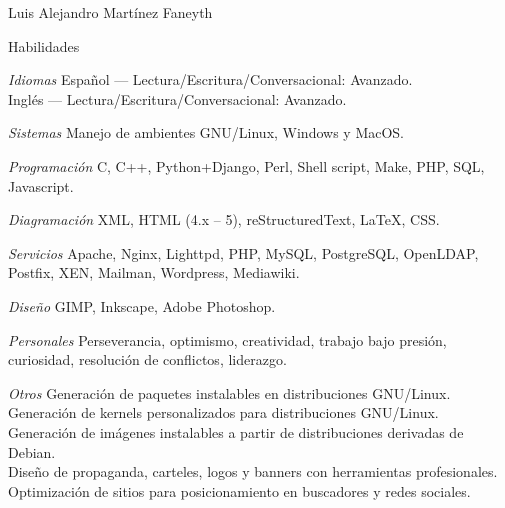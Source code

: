 \documentclass[11pt,letterpaper]{article}
\begin{document}
\begin{cv}{Luis Alejandro Mart\'inez Faneyth}
\begin{cvlist}{Habilidades}
\item[\textit{\large{Idiomas}}]{
	Espa\~nol --- Lectura/Escritura/Conversacional: Avanzado.\\
	Ingl\'es --- Lectura/Escritura/Conversacional: Avanzado.
}
\item[\textit{\large{Sistemas}}]{Manejo de ambientes GNU/Linux, Windows y MacOS.}
\item[\textit{\large{Programaci\'on}}]{C, C++, Python+Django, Perl, Shell script, Make, PHP, SQL, Javascript.}
\item[\textit{\large{Diagramaci\'on}}]{XML, HTML (4.x -- 5), reStructuredText, \LaTeX, CSS.}
\item[\textit{\large{Servicios}}]{Apache, Nginx, Lighttpd, PHP, MySQL, PostgreSQL, OpenLDAP, Postfix, XEN, Mailman, Wordpress, Mediawiki.}
\item[\textit{\large{Dise\~no}}]{GIMP, Inkscape, Adobe Photoshop.}
\item[\textit{\large{Personales}}]{Perseverancia, optimismo, creatividad, trabajo bajo presi\'on, curiosidad, resoluci\'on de conflictos, liderazgo.}
\item[\textit{\large{Otros}}]{
	Generaci\'on de paquetes instalables en distribuciones GNU/Linux.\\
	Generaci\'on de kernels personalizados para distribuciones GNU/Linux.\\
	Generaci\'on de im\'agenes instalables a partir de distribuciones derivadas de Debian.\\
	Diseño de propaganda, carteles, logos y banners con herramientas profesionales.\\
	Optimización de sitios para posicionamiento en buscadores y redes sociales.
}
\end{cvlist}

\end{cv}
\end{document}
